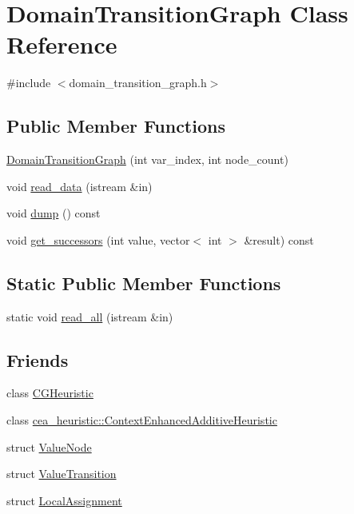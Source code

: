 \hypertarget{classDomainTransitionGraph}{\section{Domain\-Transition\-Graph Class Reference}
\label{classDomainTransitionGraph}
}


{\ttfamily \#include $<$domain\-\_\-transition\-\_\-graph.\-h$>$}

\subsection*{Public Member Functions}
\begin{DoxyCompactItemize}
\item 
\hyperlink{classDomainTransitionGraph_a936f3aae8f284484bf3ef1a2f4e7e956}{Domain\-Transition\-Graph} (int var\-\_\-index, int node\-\_\-count)
\item 
void \hyperlink{classDomainTransitionGraph_a80221d83ff7109b5f5b64a8851a4a075}{read\-\_\-data} (istream \&in)
\item 
void \hyperlink{classDomainTransitionGraph_a412189c6fdd8904ee158b10d1c26b35e}{dump} () const 
\item 
void \hyperlink{classDomainTransitionGraph_a3b669495247f768863f47b1c28a61951}{get\-\_\-successors} (int value, vector$<$ int $>$ \&result) const 
\end{DoxyCompactItemize}
\subsection*{Static Public Member Functions}
\begin{DoxyCompactItemize}
\item 
static void \hyperlink{classDomainTransitionGraph_aba53fff6f1e933d0fded474ef2d6182f}{read\-\_\-all} (istream \&in)
\end{DoxyCompactItemize}
\subsection*{Friends}
\begin{DoxyCompactItemize}
\item 
class \hyperlink{classDomainTransitionGraph_af48a2cc498085d9855e0a1d95b8ee7b4}{C\-G\-Heuristic}
\item 
class \hyperlink{classDomainTransitionGraph_acb8e7e5543a9e3929bf2d038d3a30a20}{cea\-\_\-heuristic\-::\-Context\-Enhanced\-Additive\-Heuristic}
\item 
struct \hyperlink{classDomainTransitionGraph_a111633b0408f9645dc6e3f8233f2511a}{Value\-Node}
\item 
struct \hyperlink{classDomainTransitionGraph_a14fe5a6c4d0b0fe3d17004e5a8daab2f}{Value\-Transition}
\item 
struct \hyperlink{classDomainTransitionGraph_aa088a060547b679aea38e0bc3accf661}{Local\-Assignment}
\end{DoxyCompactItemize}


